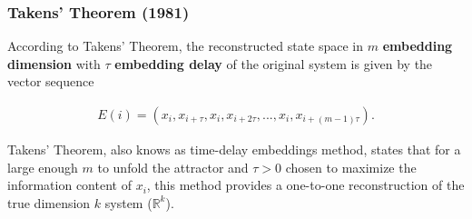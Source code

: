 \documentclass{beamer}
\theoremstyle{definition}
\newtheorem*{dfn}{Definition}
\begin{document}
\begin{frame}
\frametitle{Takens' Theorem (1981)}


According to Takens' Theorem, the reconstructed state space
in $m$ \textbf{embedding dimension} with $\tau$ \textbf{embedding delay}
of the original system is given by the vector sequence

\begin{eqnarray*} 
E(i) = (x_i, x_{i+\tau}, x_i, x_{i+2\tau}, ... , x_i, x_{i+(m-1)\tau}).
\end{eqnarray*}
 
Takens' Theorem, also knows as time-delay embeddings method, states
that for a large enough $m$ to unfold the attractor and $\tau > 0$ 
chosen to maximize the information
content of $x_i$, this method provides a 
one-to-one reconstruction
of the true dimension $k$ system ($\mathbb{R}^k$).





% 
% 


\end{frame}
\end{document}
